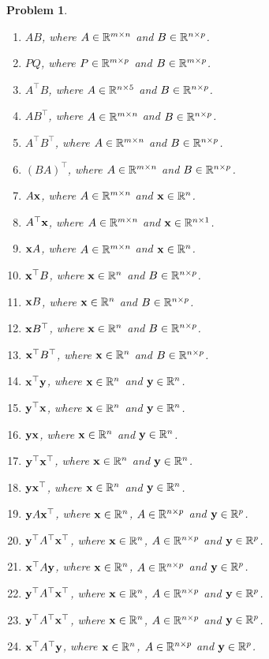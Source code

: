 \documentclass[twocolumn]{article}
\newtheorem{prob}{Problem}
\begin{document}
\begin{prob}
\begin{enumerate}
  \item $AB$, where $A \in \mathbb{R}^{m \times n}$ and $B \in \mathbb{R}^{n \times p}$.
  \item $PQ$, where $P \in \mathbb{R}^{m \times p}$ and $B \in \mathbb{R}^{m \times p}$.
  \item $A^\top B$, where $A \in \mathbb{R}^{n \times 5}$ and $B \in \mathbb{R}^{n \times p}$.
  \item $AB^\top$, where $A \in \mathbb{R}^{m \times n}$ and $B \in \mathbb{R}^{n \times p}$.
  \item $A^\top B^\top$, where $A \in \mathbb{R}^{m \times n}$ and $B \in \mathbb{R}^{n \times p}$.
  \item $(BA)^\top$, where $A \in \mathbb{R}^{m \times n}$ and $B \in \mathbb{R}^{n \times p}$.
  \item $A\mathbf{x}$, where $A \in \mathbb{R}^{m \times n}$ and $\mathbf{x} \in \mathbb{R}^{n}$.
  \item $A^\top\mathbf{x}$, where $A \in \mathbb{R}^{m \times n}$ and $\mathbf{x} \in \mathbb{R}^{n
      \times 1}$.
  \item $\mathbf{x} A$, where $A \in \mathbb{R}^{m \times n}$ and $\mathbf{x} \in \mathbb{R}^{n}$.
  \item $\mathbf{x}^\top B$, where $\mathbf{x} \in \mathbb{R}^{n}$ and $B \in \mathbb{R}^{n \times p}$.
  \item $\mathbf{x} B$, where $\mathbf{x} \in \mathbb{R}^{n}$ and $B \in \mathbb{R}^{n \times p}$.
  \item $\mathbf{x} B^\top$, where $\mathbf{x} \in \mathbb{R}^{n}$ and $B \in \mathbb{R}^{n \times p}$.
  \item $\mathbf{x}^\top B^\top$, where $\mathbf{x} \in \mathbb{R}^{n}$ and $B \in \mathbb{R}^{n \times p}$.
  \item $\mathbf{x}^\top \mathbf{y}$, where $\mathbf{x} \in \mathbb{R}^{n}$ and $\mathbf{y} \in \mathbb{R}^{n}$.
  \item $\mathbf{y}^\top \mathbf{x}$, where $\mathbf{x} \in \mathbb{R}^{n}$ and $\mathbf{y} \in \mathbb{R}^{n}$.
  \item $\mathbf{y} \mathbf{x}$, where $\mathbf{x} \in \mathbb{R}^{n}$ and $\mathbf{y} \in \mathbb{R}^{n}$.
  \item $\mathbf{y}^\top \mathbf{x}^\top$, where $\mathbf{x} \in \mathbb{R}^{n}$ and $\mathbf{y} \in \mathbb{R}^{n}$.
  \item $\mathbf{y} \mathbf{x}^\top$, where $\mathbf{x} \in \mathbb{R}^{n}$ and $\mathbf{y} \in \mathbb{R}^{n}$.
  \item $\mathbf{y} A \mathbf{x}^\top$, where $\mathbf{x} \in \mathbb{R}^{n}$, $A \in \mathbb{R}^{n \times p}$ and $\mathbf{y} \in \mathbb{R}^{p}$.
  \item $\mathbf{y}^\top A^\top \mathbf{x}^\top$, where $\mathbf{x} \in \mathbb{R}^{n}$, $A \in \mathbb{R}^{n \times p}$ and $\mathbf{y} \in \mathbb{R}^{p}$.
  \item $\mathbf{x}^\top A     \mathbf{y}    $, where $\mathbf{x} \in \mathbb{R}^{n}$, $A \in \mathbb{R}^{n \times p}$ and $\mathbf{y} \in \mathbb{R}^{p}$.
  \item $\mathbf{y}^\top A^\top \mathbf{x}^\top$, where $\mathbf{x} \in \mathbb{R}^{n}$, $A \in \mathbb{R}^{n \times p}$ and $\mathbf{y} \in \mathbb{R}^{p}$.
  \item $\mathbf{y}^\top A^\top \mathbf{x}^\top$, where $\mathbf{x} \in \mathbb{R}^{n}$, $A \in \mathbb{R}^{n \times p}$ and $\mathbf{y} \in \mathbb{R}^{p}$.
  \item $\mathbf{x}^\top A^\top \mathbf{y}$, where $\mathbf{x} \in \mathbb{R}^{n}$, $A \in \mathbb{R}^{n \times p}$ and $\mathbf{y} \in \mathbb{R}^{p}$.
  \end{enumerate}
\end{prob}
\end{document}
